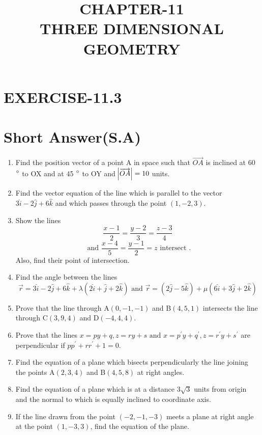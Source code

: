 \documentclass[12pt]{article}
\begin{document}
\title{\textbf{CHAPTER-11 \\THREE DIMENSIONAL GEOMETRY}}
\maketitle
\begin{center}
\end{center}
\section*{EXERCISE-11.3}
\section*{Short Answer(S.A)}
\begin{enumerate}

\item  Find the position vector of a point A in space such that $\overrightarrow{OA}$ is inclined at 60 $\degree$ to OX and at 45 $\degree$ to OY and $\abs{\overrightarrow{OA}} =10$ units.
\item  Find the vector equation of the line which is parallel to the vector $3\hat{i}-2\hat{j}+6\hat{k}$ and which passes through the point $(1,-2,3)$.
\item Show the lines
$$\frac{x-1}{2}=\frac{y-2}{3}=\frac{z-3}{4}$$
$$\text{ and } \frac{x-4}{5}=\frac{y-1}{2}=z  \text{ intersect }.$$
 Also, find their point of intersection.
\item Find the angle between the lines $$\overrightarrow{r}=3\hat{i}-2\hat{j}+6\hat{k}+\lambda(2\hat{i}+\hat{j}+2\hat{k})\text{ and } \overrightarrow{r}=(2\hat{j}-5\hat{k})+\mu(6\hat{i}+3\hat{j}+2\hat{k})$$
\item Prove that the line through A$(0,-1,-1)$ and B$(4,5,1)$ intersects the line through C$(3,9,4)$ and D$(-4,4,4)$.
\item Prove that the lines $x=py+q , z=ry+s \text{ and } x=p^{\prime}y+q^{\prime}, z=r^{\prime}y+s^{\prime} $ are perpendicular if $pp^{\prime}+rr^{\prime}+1=0$.
\item Find the equation of a plane which  bisects perpendicularly the line joining the points A$(2,3,4)$ and B$(4,5,8)$ at right angles.
\item Find the equation of a plane which is at a distance 3$\sqrt{3}$ units from origin and the normal to which is equally inclined to coordinate axis.
\item If the line drawn from the point $(-2,-1,-3)$ meets a plane at right angle at the point $(1,-3,3)$, find the equation of the plane.

\end{enumerate}
\end{document}
